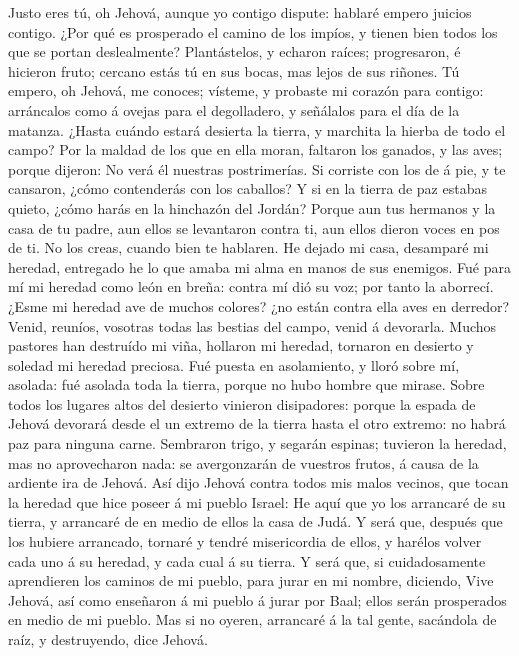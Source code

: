  Justo eres tú, oh Jehová, aunque yo contigo dispute:
hablaré empero juicios contigo. ¿Por qué es prosperado el camino de los
impíos, y tienen bien todos los que se portan deslealmente? 
Plantástelos, y echaron raíces; progresaron, é hicieron fruto; cercano
estás tú en sus bocas, mas lejos de sus riñones.  Tú empero,
oh Jehová, me conoces; vísteme, y probaste mi corazón para contigo:
arráncalos como á ovejas para el degolladero, y señálalos para el día de
la matanza.  ¿Hasta cuándo estará desierta la tierra, y
marchita la hierba de todo el campo? Por la maldad de los que en ella
moran, faltaron los ganados, y las aves; porque dijeron: No verá él
nuestras postrimerías.  Si corriste con los de á pie, y te
cansaron, ¿cómo contenderás con los caballos? Y si en la tierra de paz
estabas quieto, ¿cómo harás en la hinchazón del Jordán? 
Porque aun tus hermanos y la casa de tu padre, aun ellos se levantaron
contra ti, aun ellos dieron voces en pos de ti. No los creas, cuando
bien te hablaren.  He dejado mi casa, desamparé mi heredad,
entregado he lo que amaba mi alma en manos de sus enemigos. 
Fué para mí mi heredad como león en breña: contra mí dió su voz; por
tanto la aborrecí.  ¿Esme mi heredad ave de muchos colores?
¿no están contra ella aves en derredor? Venid, reuníos, vosotras todas
las bestias del campo, venid á devorarla.  Muchos pastores
han destruído mi viña, hollaron mi heredad, tornaron en desierto y
soledad mi heredad preciosa.  Fué puesta en asolamiento, y
lloró sobre mí, asolada: fué asolada toda la tierra, porque no hubo
hombre que mirase.  Sobre todos los lugares altos del
desierto vinieron disipadores: porque la espada de Jehová devorará desde
el un extremo de la tierra hasta el otro extremo: no habrá paz para
ninguna carne.  Sembraron trigo, y segarán espinas;
tuvieron la heredad, mas no aprovecharon nada: se avergonzarán de
vuestros frutos, á causa de la ardiente ira de Jehová.  Así
dijo Jehová contra todos mis malos vecinos, que tocan la heredad que
hice poseer á mi pueblo Israel: He aquí que yo los arrancaré de su
tierra, y arrancaré de en medio de ellos la casa de Judá. 
Y será que, después que los hubiere arrancado, tornaré y tendré
misericordia de ellos, y harélos volver cada uno á su heredad, y cada
cual á su tierra.  Y será que, si cuidadosamente
aprendieren los caminos de mi pueblo, para jurar en mi nombre, diciendo,
Vive Jehová, así como enseñaron á mi pueblo á jurar por Baal; ellos
serán prosperados en medio de mi pueblo.  Mas si no oyeren,
arrancaré á la tal gente, sacándola de raíz, y destruyendo, dice Jehová.

